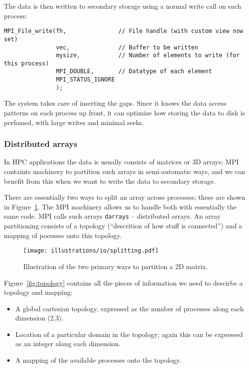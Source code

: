 The data is then written to secondary storage using a normal write call on each process:
\begin{lstlisting}
MPI_File_write(fh,               // File handle (with custom view now set)
               vec,              // Buffer to be written
               mysize,           // Number of elements to write (for this process)
               MPI_DOUBLE,       // Datatype of each element
               MPI_STATUS_IGNORE
               );
\end{lstlisting}

The system takes care of inserting the gaps. Since it knows the data access patterns on each process up front, it can optimize how storing the data to disk is perfomed, with large writes and minimal seeks.

\subsubsection{Distributed arrays} %
\label{ssub:distributed_arrays}
In HPC applications the data is usually consists of matrices or 3D arrays; MPI containts machinery to partition such arrays in semi-automatic ways, and we can benefit from this when we want to write the data to secondary storage.

There are essentially two ways to split an array across processes; these are shown in Figure~\ref{fig:splitting}. The MPI machinery allows us to handle both with essentially the same code. MPI calls such arrays \texttt{darrays} -- distributed arrays. An array partitioning consists of a topology (``descrition of how stuff is connected'') and a mapping of pocesses onto this topology.

\begin{figure}[htbp]
  \centering
  \texttt{[image: illustrations/io/splitting.pdf]}
  \caption{Illustration of the two primary ways to partition a 2D matrix.}
  \label{fig:splitting}
\end{figure}

Figure~\ref{fig:topology} contains all the pieces of information we need to descirbe a topology and mapping:
\begin{itemize}
  \item A global cartesian topology, expressed as the number of processes along each dimension (2,3).
  \item Location of a particular domain in the topology; again this can be expressed as an integer along each dimension.
  \item A mapping of the available processes onto the topology.
\end{itemize}

